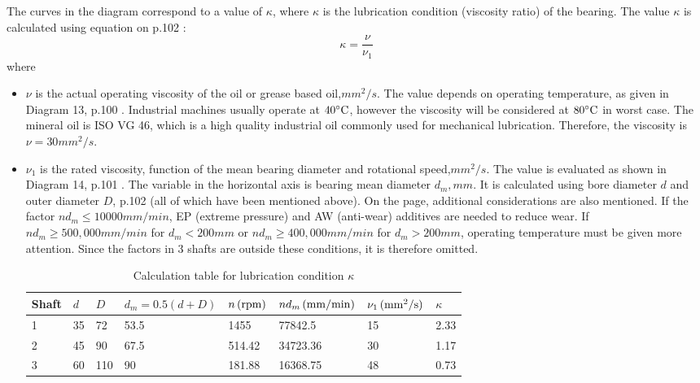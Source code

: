 \begin{itemize}
	The curves in the diagram correspond to a value of $ \kappa $, where $ \kappa $ is the lubrication condition (viscosity ratio) of the bearing. The value $ \kappa $ is calculated using equation on p.102 \cite{rolling_bearings}:
	\[
	\kappa = \dfrac{\nu}{\nu_1}
	\]
	where
	\begin{itemize}
		\item $ \nu $ is the actual operating viscosity of the oil or grease based oil,$ \unit{mm^2/s} $. The value depends on operating temperature, as given in Diagram 13, p.100 \cite{rolling_bearings}. Industrial machines usually operate at $ 40^\circ \text{C} $, however the viscosity will be considered at $ 80^\circ \text{C} $ in worst case. The mineral oil is ISO VG 46, which is a high quality industrial oil commonly used for mechanical lubrication. Therefore, the viscosity is $ \nu = 30 \unit{mm^2/s} $.
		\item $ \nu_1 $ is the rated viscosity, function of the mean bearing diameter and rotational speed,$ \unit{mm^2/s} $. The value is evaluated as shown in Diagram 14, p.101 \cite{rolling_bearings}. The variable in the horizontal axis is bearing mean diameter $ d_m, \unit{mm} $. It is calculated using bore diameter $ d $ and outer diameter $ D $, p.102 \cite{rolling_bearings} (all of which have been mentioned above). On the page, additional considerations are also mentioned. If the factor $ nd_m\leq 10000\unit{mm/min} $, EP (extreme pressure) and AW (anti-wear) additives are needed to reduce wear. If $ nd_m \geq 500,000\unit{mm/min} $ for $ d_m < 200 \unit{mm} $ or $ nd_m \geq 400,000 \unit{mm/min} $ for $ d_m > 200 \unit{mm} $, operating temperature must be given more attention. Since the factors in 3 shafts are outside these conditions, it is therefore omitted.
		\begin{table}[ht]
			\centering
			\caption{Calculation table for lubrication condition $ \kappa $}
			\begin{tabular}{llllllll}\toprule
				Shaft & $ d $ & $ D $ & $ d_m = 0.5(d+D) $ & $ n \, (\mathrm{rpm}) $ & $ nd_m \, (\mathrm{mm/min}) $ & $ \nu_1 \, (\mathrm{mm^2/s}) $ & $ \kappa $ \\\midrule
				1 & 35 & 72 & 53.5 & 1455 & 77842.5 & 15 & 2.33\\
				2 & 45 & 90 & 67.5 & 514.42 & 34723.36 & 30 & 1.17\\
				3 & 60 & 110 & 90 & 181.88 & 16368.75 & 48 & 0.73\\\bottomrule
			\end{tabular}
		\end{table}
	\end{itemize}
	

\end{itemize}
